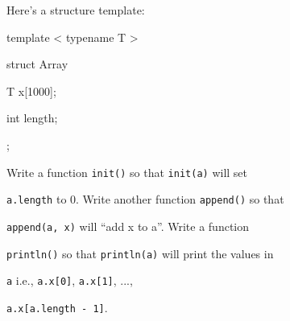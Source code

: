 Here's a structure template:



\begin{consolethree}[escapeinside=||]

template < typename T >

struct Array

{

    T x[1000];

    int length;

};

\end{consolethree}



Write a function \texttt{init()} so that \texttt{init(a)} will set

\texttt{a.length} to 0. Write another function \texttt{append()} so that

\texttt{append(a, x)} will ``add x to a''. Write a function

\texttt{println()} so that \texttt{println(a)} will print the values in

\texttt{a} i.e., \texttt{a.x[0]}, \texttt{a.x[1]}, ...,

\texttt{a.x[a.length - 1]}.

